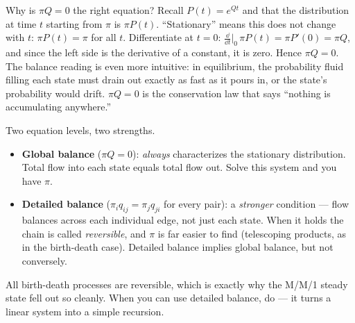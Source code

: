 \begin{whybox}
Why is $\pi Q = 0$ the right equation? Recall $P(t) = e^{Qt}$ and that the distribution at time $t$
starting from $\pi$ is $\pi P(t)$. ``Stationary'' means this does not change with $t$: $\pi P(t) =
\pi$ for all $t$. Differentiate at $t = 0$: $\frac{\dd}{\dd t}\big|_{0}\,\pi P(t) = \pi P'(0) = \pi
Q$, and since the left side is the derivative of a constant, it is zero. Hence $\pi Q = 0$. The
balance reading is even more intuitive: in equilibrium, the probability fluid filling each state
must drain out exactly as fast as it pours in, or the state's probability would drift. $\pi Q = 0$ is
the conservation law that says ``nothing is accumulating anywhere.''
\end{whybox}

\begin{focusbox}
Two equation levels, two strengths.
\begin{itemize}
  \item \textbf{Global balance} ($\pi Q = 0$): \emph{always} characterizes the stationary
  distribution. Total flow into each state equals total flow out. Solve this system and you have
  $\pi$.
  \item \textbf{Detailed balance} ($\pi_i q_{ij} = \pi_j q_{ji}$ for every pair): a \emph{stronger}
  condition --- flow balances across each individual edge, not just each state. When it holds the
  chain is called \emph{reversible}, and $\pi$ is far easier to find (telescoping products, as in the
  birth-death case). Detailed balance implies global balance, but not conversely.
\end{itemize}
All birth-death processes are reversible, which is exactly why the M/M/1 steady state fell out so
cleanly. When you can use detailed balance, do --- it turns a linear system into a simple recursion.
\end{focusbox}

